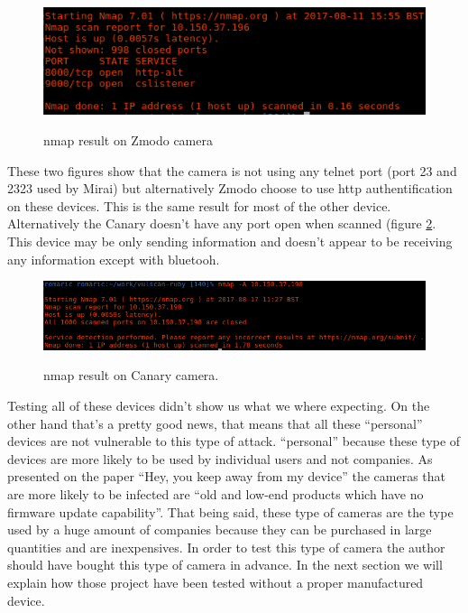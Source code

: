 \documentclass{report}
\begin{document}
\begin{figure}[h]
 \caption{nmap result on Zmodo camera}
 \centering
 \includegraphics[width=1.2\textwidth]{./img/exp/resultelse}
 \label{fig:resultelse-zm}
\end{figure}
These two figures show that the camera is not using any telnet port (port 23 and 2323 used by Mirai) but alternatively Zmodo choose to use http authentification on these devices. This is the same result for most of the other device.\newline
Alternatively the Canary doesn't have any port open when scanned (figure \ref{fig:canary}. This device may be only sending information and doesn't appear to be receiving any information except with bluetooh.
\newpage
\begin{figure}[h]
 \caption{nmap result on Canary \protect\footnotemark camera.}
 \centering
 \includegraphics[width=1.2\textwidth]{./img/exp/canary}
 \label{fig:canary}
\end{figure}


Testing all of these devices didn't show us what we where expecting. On the other hand that's a pretty good news, that means that all these ``personal'' devices are not vulnerable to this type of attack. ``personal'' because these type of devices are more likely to be used by individual users and not companies. As presented on the paper ``Hey, you keep away from my device'' \autocite{cao2017hey} the cameras that are more likely to be infected are ``old and low-end products which have no firmware update capability''. That being said, these type of cameras are the type used by a huge amount of companies because they can be purchased in large quantities and are inexpensives. In order to test this type of camera the author should have bought this type of camera in advance.\newline
In the next section we will explain how those project have been tested without a proper manufactured device.
\end{document}
